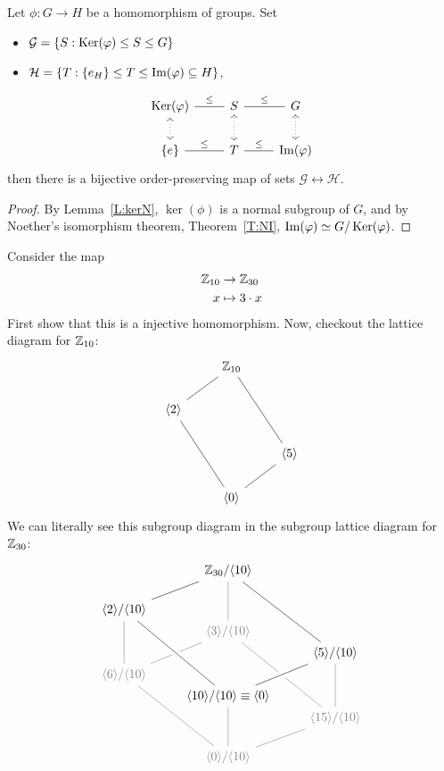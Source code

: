 \documentclass{ximera}
\begin{document}
\begin{corollary}
  Let $\phi:G\to H$ be a homomorphism of groups. Set
  \begin{itemize}
  \item $\mathcal{G} = \{S:\mathop{\mathrm{Ker}}\nolimits(\varphi)\leq S\leq G\}$
  \item $\mathcal{H} = \{T:\{e_H\}\leq T\leq \operatorname{Im}(\varphi)\subseteq H\}$,
  \end{itemize}
  \[
  \begin{tikzcd}
    \ker(\phi) \ar[r,-,"\subgp"] \ar[d,<->,dotted]& S\ar[r,-,"\subgp"] \ar[d,<->,dotted]& G \ar[d,<->,dotted]\\
    \{e\} \ar[r,-,"\subgp"] & T \ar[r,-,"\subgp"] & \im(\phi)
  \end{tikzcd}
  \]
  then there is a bijective order-preserving map of sets
  $\mathcal{G}\leftrightarrow\mathcal{H}$.
  \begin{proof}
    By Lemma~\ref{L:kerN}, $\ker(\phi)$ is a normal subgroup of $G$,
    and by Noether's isomorphism theorem, Theorem~\ref{T:NI},
    $\operatorname{Im}(\varphi)\simeq G/\mathop{\mathrm{Ker}}\nolimits(\varphi)$.
  \end{proof}
\end{corollary}

\begin{example}
  Consider the map
  \begin{align*}
    \mathbb Z_{10} &\to \mathbb Z_{30}\\
    x &\mapsto 3\cdot x
  \end{align*}
  First show that this is a injective homomorphism. Now, checkout the
  lattice diagram for $\mathbb Z_{10}$:
  \[
  \begin{tikzcd}
    & \Z_{10} \ar[ld,-]  \ar[rdd,-] &       \\
    \< 2\> \ar[rdd,-]&       &       \\
    &       & \<5\> \ar[ld,-]\\
    & \<0\> &
  \end{tikzcd}
  \]
  We can literally see this subgroup diagram in the subgroup lattice
  diagram for $\mathbb Z_{30}$:
  \[
  \begin{tikzcd}[row sep=0in]
    & \Z_{30}/\<10\>\ar[ldd,-]  \ar[white!50!black,ddd,-] \ar[rdddd,-] &       \\
    &\phantom{MM} & \\
    \<2\> /\<10\> \ar[white!50!black,ddd,-] &   &  \\
    & \color{white!50!black}\<3\>/\<10\>\ar[white!50!black,ldd,-]\ar[white!50!black,rdddd,-] & \\
    &  &  \<5\> /\<10\>\ar[white!50!black,ddd,-]\\
     \color{white!50!black}\<6\>/\<10\>\ar[white!50!black,rdddd,-]& & \\
    &\<10\>/\<10\> \equiv \<0\> \ar[white!50!black,ddd,-]\ar[ruu,-,white,line width=2mm]\ar[ruu,-]\ar[luuuu,-,white,line width=2mm]\ar[luuuu,-] & \\
    & & \color{white!50!black} \<15\>/\<10\>\ar[white!50!black,ldd,-]\\
    &\phantom{MM} & \\
    &  \color{white!50!black}\<0\>/\<10\> &
  \end{tikzcd}
  \]
\end{example}
\end{document}
